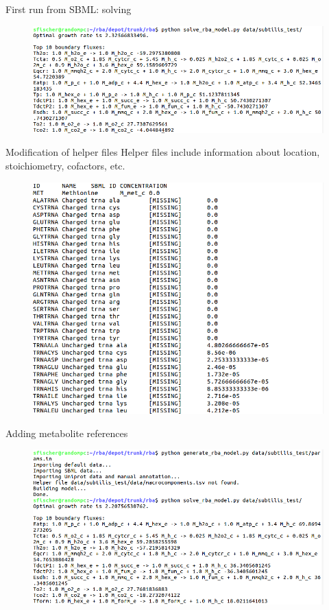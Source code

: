 \documentclass{beamer}
\begin{document}
\begin{frame}{First run from SBML: solving}
  \begin{figure}
    \centering
    \includegraphics[width=\linewidth]{first_run_solver}
  \end{figure}
\end{frame}

\begin{frame}{Modification of helper files}
  Helper files include information about location, stoichiometry,
  cofactors, etc.
  \begin{figure}
    \centering
    \includegraphics[width=0.8\linewidth]{helper_file_metabolites}
  \end{figure}
\end{frame}

\begin{frame}{Adding metabolite references}
  \begin{figure}
    \centering
    \includegraphics[width=\linewidth]{added_metabolites}
  \end{figure}
\end{frame}
\end{document}
